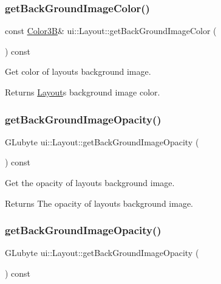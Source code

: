 \subsubsection{\texorpdfstring{get\+Back\+Ground\+Image\+Color()}{getBackGroundImageColor()}\hspace{0.1cm}{\footnotesize\ttfamily [2/2]}}
{\footnotesize\ttfamily const \hyperlink{structColor3B}{Color3B}\& ui\+::\+Layout\+::get\+Back\+Ground\+Image\+Color (\begin{DoxyParamCaption}{ }\end{DoxyParamCaption}) const}

Get color of layout\textquotesingle{}s background image. \begin{DoxyReturn}{Returns}
\hyperlink{classui_1_1Layout}{Layout}\textquotesingle{}s background image color. 
\end{DoxyReturn}
\mbox{\label{classui_1_1Layout_af77ed069ce97332a6baab5fe81bfef2d}} 
\subsubsection{\texorpdfstring{get\+Back\+Ground\+Image\+Opacity()}{getBackGroundImageOpacity()}\hspace{0.1cm}{\footnotesize\ttfamily [1/2]}}
{\footnotesize\ttfamily G\+Lubyte ui\+::\+Layout\+::get\+Back\+Ground\+Image\+Opacity (\begin{DoxyParamCaption}{ }\end{DoxyParamCaption}) const}

Get the opacity of layout\textquotesingle{}s background image. \begin{DoxyReturn}{Returns}
The opacity of layout\textquotesingle{}s background image. 
\end{DoxyReturn}
\mbox{\label{classui_1_1Layout_af77ed069ce97332a6baab5fe81bfef2d}} 
\subsubsection{\texorpdfstring{get\+Back\+Ground\+Image\+Opacity()}{getBackGroundImageOpacity()}\hspace{0.1cm}{\footnotesize\ttfamily [2/2]}}
{\footnotesize\ttfamily G\+Lubyte ui\+::\+Layout\+::get\+Back\+Ground\+Image\+Opacity (\begin{DoxyParamCaption}{ }\end{DoxyParamCaption}) const}

